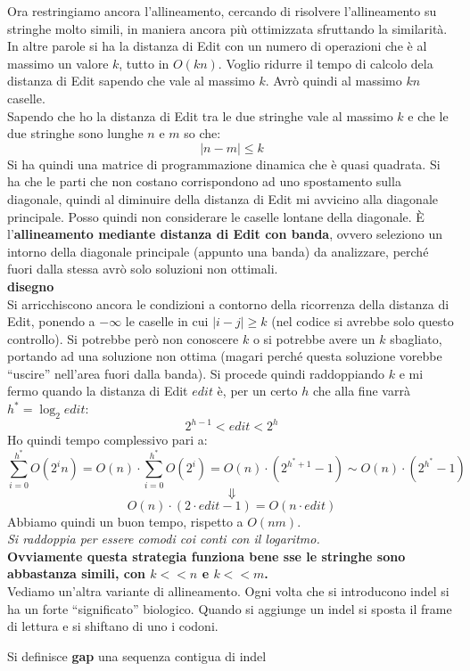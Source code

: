 \documentclass[a4paper,12pt, oneside]{book}
\begin{document}
Ora restringiamo ancora l'allineamento, cercando di risolvere
l'allineamento su stringhe molto simili, in maniera ancora più
ottimizzata sfruttando la similarità. In altre parole si ha la
distanza di Edit con un numero di operazioni che è al massimo un
valore $k$, tutto in $O(kn)$. Voglio ridurre il tempo di calcolo dela
distanza di Edit sapendo che vale al massimo $k$. Avrò quindi al
massimo $kn$ caselle.\\
Sapendo che ho la distanza di Edit tra le due stringhe  vale al
massimo $k$ e che le due stringhe sono lunghe $n$ e $m$ so che:
\[|n-m|\leq k\]
Si ha quindi una matrice di programmazione dinamica che è quasi
quadrata. Si ha che le parti che non costano corrispondono ad uno
spostamento sulla diagonale, quindi al diminuire della distanza di
Edit mi avvicino alla diagonale principale. Posso quindi non
considerare le caselle lontane della diagonale. È l'\textbf{allineamento
  mediante distanza di Edit con banda}, ovvero seleziono un intorno
della diagonale principale (appunto una banda) da analizzare, perché
fuori dalla stessa avrò solo soluzioni non ottimali.\\
\textbf{disegno}\\
Si arricchiscono ancora le condizioni a contorno della ricorrenza
della distanza di Edit, ponendo a $-\infty$ le caselle in cui
$|i-j|\geq k$ (nel codice si avrebbe solo questo controllo).
Si potrebbe però non conoscere $k$ o si potrebbe avere un $k$
sbagliato, portando ad una soluzione non ottima (magari perché questa
soluzione vorebbe ``uscire'' nell'area fuori dalla banda). Si procede
quindi raddoppiando $k$ e mi fermo quando la distanza di Edit $edit$ è,
per un certo $h$ che alla fine varrà $h^*=\log_2 edit$:
\[2^{h-1}<edit<2^h\]
Ho quindi tempo complessivo pari a:
\[\sum_{i=0}^{h^*}O(2^in)=O(n)\cdot\sum_{i=0}^{h^*}O(2^i)=O(n)\cdot
  (2^{h^*+1}-1)\sim O(n)\cdot (2^{h^*}-1)\]
\[\Downarrow\]
\[O(n)\cdot (2\cdot edit -1)=O(n\cdot edit)\]
Abbiamo quindi un buon tempo, rispetto a $O(nm)$.\\
\textit{Si raddoppia per essere comodi coi conti con il logaritmo.}\\
\textbf{Ovviamente questa strategia funziona bene sse le stringhe sono
  abbastanza simili, con $k<<n$ e $k<<m$.}\\
Vediamo un'altra variante di allineamento. Ogni volta che si
introducono indel si ha un forte ``significato'' biologico. Quando si
aggiunge un indel si sposta il frame di lettura e si shiftano di uno i
codoni. 
\begin{definizione}
  Si definisce \textbf{gap} una sequenza contigua di indel
\end{definizione}
\end{document}
